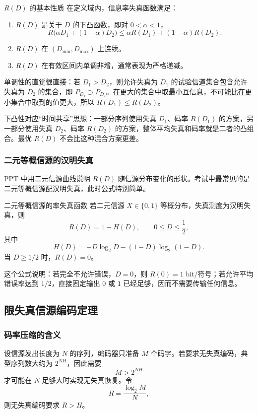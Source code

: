 \begin{theoremBox}{$R(D)$ 的基本性质}
在定义域内，信息率失真函数满足：
\begin{enumerate}
  \item $R(D)$ 是关于 $D$ 的下凸函数，即对 $0<\alpha<1$，
  \[
  R\bigl(\alpha D_1+(1-\alpha)D_2\bigr)
  \le \alpha R(D_1)+(1-\alpha)R(D_2).
  \]
  \item $R(D)$ 在 $(D_{\min},D_{\max})$ 上连续。
  \item $R(D)$ 在有效区间内单调非增，通常表现为严格递减。
\end{enumerate}
\end{theoremBox}

单调性的直觉很直接：若 $D_1>D_2$，则允许失真为 $D_1$ 的试验信道集合包含允许失真为 $D_2$ 的集合，即 $P_{D_1}\supset P_{D_2}$。在更大的集合中取最小互信息，不可能比在更小集合中取到的值更大，所以 $R(D_1)\le R(D_2)$。

下凸性对应“时间共享”思想：一部分序列使用失真 $D_1$、码率 $R(D_1)$ 的方案，另一部分使用失真 $D_2$、码率 $R(D_2)$ 的方案，整体平均失真和码率就是二者的凸组合。最优 $R(D)$ 不会比这种混合方案更差。

\subsubsection{二元等概信源的汉明失真}

PPT 中用二元信源曲线说明 $R(D)$ 随信源分布变化的形状。考试中最常见的是二元等概信源配汉明失真，此时公式特别简单。

\begin{formulaBox}{二元等概信源的率失真函数}
若二元信源 $X\in\{0,1\}$ 等概分布，失真测度为汉明失真，则
\[
R(D)=1-H(D),
\qquad 0\le D\le\frac12,
\]
其中
\[
H(D)=-D\log_2D-(1-D)\log_2(1-D).
\]
当 $D\ge1/2$ 时，$R(D)=0$。
\end{formulaBox}

这个公式说明：若完全不允许错误，$D=0$，则 $R(0)=1$ bit/符号；若允许平均错误率达到 $1/2$，直接固定输出 $0$ 或 $1$ 已经足够，因而不需要传输任何信息。

\subsection{限失真信源编码定理}

\subsubsection{码率压缩的含义}

设信源发出长度为 $N$ 的序列，编码器只准备 $M$ 个码字。若要求无失真编码，典型序列数大约为 $2^{NH}$，因此需要
\[
M>2^{NH}
\]
才可能在 $N$ 足够大时实现无失真恢复。令
\[
R=\frac{\log_2 M}{N},
\]
则无失真编码要求 $R>H$。

